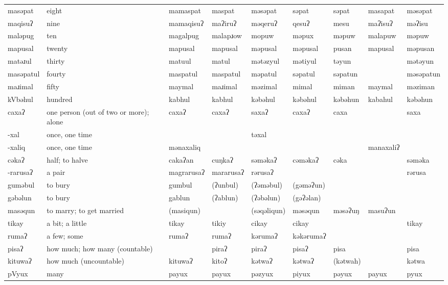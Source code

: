 \begin{landscape}
\begin{longtable}{*{9}{p{}}}
\text{*}masəpat & eight & mamaspat & maspat & məsəpat & səpat & səpat & masapat & məsəpat\\
\text{*}maqisuʔ & nine & mamaqisuʔ & maʔiruʔ & məqeruʔ & qesuʔ & mesu & maʔisuʔ & məʔisu\\
\text{*}maləpug & ten & magalpug & malapɹow & mopuw & məpux & məpuw & malapuw & məpuw\\
\text{*}mapusal & twenty & mapusal & mapusal & məpusal & məpusal & pusan & mapusal & məpusan\\
\text{*}matəɹul & thirty & matuul & matul & mətəzyul & mətiyul & təyun &  & mətəyun\\
\text{*}masəpatul & fourty & maspatul & maspatul & məpatul & səpatul & səpatun &  & məsəpatun\\
\text{*}maɹimal & fifty & maymal & maɹimal & məzimal & mimal & miman & maymal & məziman\\
\text{*}kVbəhul & hundred & kabhul & kabhul & kəbəhul & kəbəhul & kəbəhun & kabahul & kəbəhun\\
\text{*}caxaʔ & one person (out of two or more); alone & caxaʔ & caxaʔ & saxaʔ & caxaʔ & caxa &  & saxa\\
\text{*}-xal & once, one time &  &  & təxal &  &  &  & \\
\text{*}-xaliq & once, one time & mənaxaliq &  &  &  &  & manaxaliʔ & \\
\text{*}cəkaʔ & half; to halve & cakaʔan & cuŋkaʔ & səməkaʔ & cəməkaʔ & cəka &  & səməka\\
\text{*}-rarusaʔ & a pair & magrarusaʔ & mararusaʔ & rərusaʔ &  &  &  & rərusa\\
\text{*}guməbul & to bury & gumbul & (ʔunbul) & (ʔəməbul) & (gəməʔun) &  &  & \\
\text{*}gəbəlun & to bury & gablun & (ʔablun) & (ʔəbəlun) & (gəʔəlan) &  &  & \\
\text{*}masəqun & to marry; to get married & (masiqun) &  & (səqəliqun) & məsəqun & məsəʔuŋ & masuʔun & \\
\text{*}tikay & a bit; a little & tikay & tikiy & cikay & cikay &  &  & tikay\\
\text{*}rumaʔ & a few; some & rumaʔ & rumaʔ & kərumaʔ & kəkərumaʔ &  &  & \\
\text{*}pisaʔ & how much; how many (countable) &  & piraʔ & piraʔ & pisaʔ & pisa &  & pisa\\
\text{*}kituwaʔ & how much (uncountable) & kituwaʔ & kitoʔ & kətwaʔ & kətwaʔ & (kətwah) &  & kətwa\\
\text{*}pVyux & many & payux & payux & pəzyux & piyux & pəyux & payux & pyux\\

\end{longtable}
\end{landscape}
